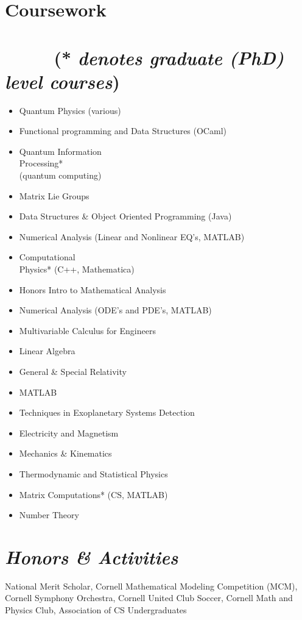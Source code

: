\documentclass{res}
\begin{document}
{\begin{resume}
\section{\textbf{Coursework \textmd{~~~~~~~~~~~~~~~~~~~~~~~~~~~~~~~~~~~~(* \textit{denotes graduate (PhD) level courses})}}}
\begin{adjustwidth}{2.4em}{-65pt}
\begin{multicols}{3}
\begin{itemize}
\item{Quantum Physics (various)}
\item{Functional programming and Data Structures (OCaml)}
\item{Quantum Information\\
Processing*\\
(quantum computing)}
\item{Matrix Lie Groups}
\item{Data Structures \&
Object Oriented Programming (Java)}
\item{Numerical Analysis (Linear and Nonlinear EQ's, MATLAB)}
\item{Computational\\
Physics* (C++, Mathematica)}
\item{Honors Intro to Mathematical Analysis}
\item{Numerical Analysis (ODE's and PDE's, MATLAB)}
\item{Multivariable Calculus for Engineers}
\item{Linear Algebra}
\item{General \& Special Relativity}
\item{MATLAB}
\item{Techniques in Exoplanetary Systems Detection}
\item{Electricity and Magnetism}
\item{Mechanics \& Kinematics}
\item{Thermodynamic and Statistical Physics}
\item{Matrix Computations* (CS, MATLAB)}
\item{Number Theory}
\end{itemize}
\end{multicols}
\end{adjustwidth}
\section{\sl\bf  Honors \& Activities}
\begin{ncolumn}{1}
National Merit Scholar, Cornell Mathematical Modeling Competition (MCM), Cornell Symphony Orchestra, Cornell United Club Soccer, Cornell Math and Physics Club, Association of CS Undergraduates
\end{ncolumn}
\end{resume}
\vfill} %
\end{document}
